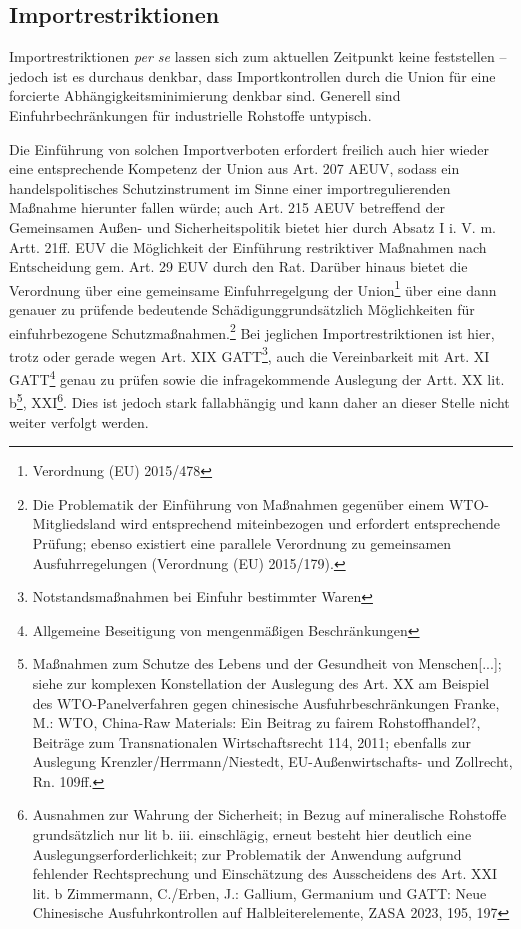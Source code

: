 \documentclass[12pt,a4paper,oneside]{book} %
\begin{document}
\subsection{Importrestriktionen}
Importrestriktionen \textit{per se} lassen sich zum aktuellen Zeitpunkt keine feststellen -- jedoch ist es durchaus denkbar, dass Importkontrollen durch die Union für eine forcierte Abhängigkeitsminimierung denkbar sind. Generell sind Einfuhrbechränkungen für industrielle Rohstoffe untypisch.\autocite{Schorkopf, Rohstoffverwaltung, Rn. 37}

Die Einführung von solchen Importverboten erfordert freilich auch hier wieder eine entsprechende Kompetenz der Union aus Art. 207 AEUV, sodass ein handelspolitisches Schutzinstrument im Sinne einer importregulierenden Maßnahme hierunter fallen würde; auch Art. 215 AEUV betreffend der Gemeinsamen Außen- und Sicherheitspolitik bietet hier durch Absatz I i. V. m. Artt. 21ff. EUV die Möglichkeit der Einführung restriktiver Maßnahmen nach Entscheidung gem. Art. 29 EUV durch den Rat. Darüber hinaus bietet die Verordnung über eine gemeinsame Einfuhrregelgung der Union\footnote{Verordnung (EU) 2015/478} über eine dann genauer zu prüfende \glqq bedeutende Schädigung\grqq grundsätzlich Möglichkeiten für einfuhrbezogene Schutzmaßnahmen.\footnote{Die Problematik der Einführung von Maßnahmen gegenüber einem WTO-Mitgliedsland wird entsprechend miteinbezogen und erfordert entsprechende Prüfung; ebenso existiert eine parallele Verordnung zu gemeinsamen Ausfuhrregelungen (Verordnung (EU) 2015/179).} Bei jeglichen Importrestriktionen ist hier, trotz oder gerade wegen Art. XIX GATT\footnote{Notstandsmaßnahmen bei Einfuhr bestimmter Waren}, auch die Vereinbarkeit mit Art. XI GATT\footnote{Allgemeine Beseitigung von mengenmäßigen Beschränkungen} genau zu prüfen sowie die infragekommende Auslegung der Artt. XX lit. b\footnote{Maßnahmen zum Schutze des Lebens und der Gesundheit von Menschen[...]; siehe zur komplexen Konstellation der Auslegung des Art. XX am Beispiel des WTO-Panelverfahren gegen chinesische Ausfuhrbeschränkungen Franke, M.: WTO, China-Raw Materials: Ein Beitrag zu fairem Rohstoffhandel?, Beiträge zum Transnationalen Wirtschaftsrecht 114, 2011; ebenfalls zur Auslegung Krenzler/Herrmann/Niestedt, EU-Außenwirtschafts- und Zollrecht, Rn. 109ff.}, XXI\footnote{Ausnahmen zur Wahrung der Sicherheit; in Bezug auf mineralische Rohstoffe grundsätzlich nur lit b. iii. einschlägig, erneut besteht hier deutlich eine Auslegungserforderlichkeit; zur Problematik der Anwendung aufgrund fehlender Rechtsprechung und Einschätzung des Ausscheidens des Art. XXI lit. b Zimmermann, C./Erben, J.: Gallium, Germanium und GATT: Neue Chinesische Ausfuhrkontrollen auf Halbleiterelemente, ZASA 2023, 195, 197}. Dies ist jedoch stark fallabhängig und kann daher an dieser Stelle nicht weiter verfolgt werden.
\end{document}
